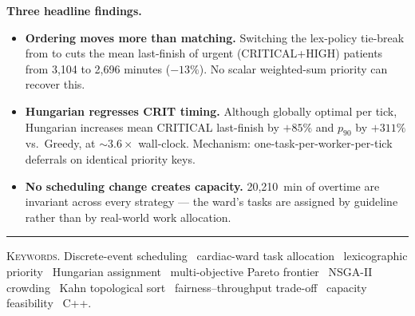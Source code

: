 \vspace{0.9em}
\noindent\textbf{Three headline findings.}
\begin{itemize}
  \item \textbf{Ordering moves more than matching.}
        Switching the lex-policy tie-break from 
        to  cuts the mean last-finish of
        urgent (CRITICAL+HIGH) patients from 3{,}104 to 2{,}696
        minutes ($-13\%$). No scalar weighted-sum priority can
        recover this.
  \item \textbf{Hungarian regresses CRIT timing.}
        Although globally optimal per tick, Hungarian increases
        mean CRITICAL last-finish by $+85\%$ and $p_{90}$ by
        $+311\%$ vs.\ Greedy, at $\sim\!3.6\times$ wall-clock.
        Mechanism: one-task-per-worker-per-tick deferrals on
        identical priority keys.
  \item \textbf{No scheduling change creates capacity.}
        20{,}210~min of overtime are invariant across every
        strategy --- the ward's tasks are assigned by guideline
        rather than by real-world work allocation.
\end{itemize}

\vfill

\noindent\rule{\textwidth}{0.4pt}
\vspace{0.5em}

\noindent
\textsc{Keywords.}\;
Discrete-event scheduling
\textbullet{}\,
cardiac-ward task allocation
\textbullet{}\,
lexicographic priority
\textbullet{}\,
Hungarian assignment
\textbullet{}\,
multi-objective Pareto frontier
\textbullet{}\,
NSGA-II crowding
\textbullet{}\,
Kahn topological sort
\textbullet{}\,
fairness--throughput trade-off
\textbullet{}\,
capacity feasibility
\textbullet{}\,
C++.

\clearpage
